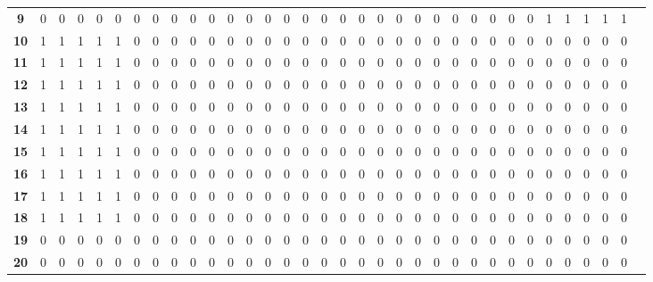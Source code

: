 \documentclass[Main]{subfiles}
\begin{document}
\begin{table}[H]
{\begin{tabular}{cccccccccccccccccccccccccccccccccc}
			\textbf{ 9} &  0 &  0 &  0 &  0 &  0 &  0 &  0 &  0 &  0 &  0 &  0 &  0 &  0 &  0 &  0 &  0 &  0 &  0 &  0 &  0 &  0 &  0 &  0 &  0 &  0 &  0 &  0 &  1 &  1 &  1 &  1 &  1 \\
			\textbf{10} &  1 &  1 &  1 &  1 &  1 &  0 &  0 &  0 &  0 &  0 &  0 &  0 &  0 &  0 &  0 &  0 &  0 &  0 &  0 &  0 &  0 &  0 &  0 &  0 &  0 &  0 &  0 &  0 &  0 &  0 &  0 &  0 \\
			\textbf{11} &  1 &  1 &  1 &  1 &  1 &  0 &  0 &  0 &  0 &  0 &  0 &  0 &  0 &  0 &  0 &  0 &  0 &  0 &  0 &  0 &  0 &  0 &  0 &  0 &  0 &  0 &  0 &  0 &  0 &  0 &  0 &  0 \\
			\textbf{12} &  1 &  1 &  1 &  1 &  1 &  0 &  0 &  0 &  0 &  0 &  0 &  0 &  0 &  0 &  0 &  0 &  0 &  0 &  0 &  0 &  0 &  0 &  0 &  0 &  0 &  0 &  0 &  0 &  0 &  0 &  0 &  0 \\
			\textbf{13} &  1 &  1 &  1 &  1 &  1 &  0 &  0 &  0 &  0 &  0 &  0 &  0 &  0 &  0 &  0 &  0 &  0 &  0 &  0 &  0 &  0 &  0 &  0 &  0 &  0 &  0 &  0 &  0 &  0 &  0 &  0 &  0 \\
			\textbf{14} &  1 &  1 &  1 &  1 &  1 &  0 &  0 &  0 &  0 &  0 &  0 &  0 &  0 &  0 &  0 &  0 &  0 &  0 &  0 &  0 &  0 &  0 &  0 &  0 &  0 &  0 &  0 &  0 &  0 &  0 &  0 &  0 \\
			\textbf{15} &  1 &  1 &  1 &  1 &  1 &  0 &  0 &  0 &  0 &  0 &  0 &  0 &  0 &  0 &  0 &  0 &  0 &  0 &  0 &  0 &  0 &  0 &  0 &  0 &  0 &  0 &  0 &  0 &  0 &  0 &  0 &  0 \\
			\textbf{16} &  1 &  1 &  1 &  1 &  1 &  0 &  0 &  0 &  0 &  0 &  0 &  0 &  0 &  0 &  0 &  0 &  0 &  0 &  0 &  0 &  0 &  0 &  0 &  0 &  0 &  0 &  0 &  0 &  0 &  0 &  0 &  0 \\
			\textbf{17} &  1 &  1 &  1 &  1 &  1 &  0 &  0 &  0 &  0 &  0 &  0 &  0 &  0 &  0 &  0 &  0 &  0 &  0 &  0 &  0 &  0 &  0 &  0 &  0 &  0 &  0 &  0 &  0 &  0 &  0 &  0 &  0 \\
			\textbf{18} &  1 &  1 &  1 &  1 &  1 &  0 &  0 &  0 &  0 &  0 &  0 &  0 &  0 &  0 &  0 &  0 &  0 &  0 &  0 &  0 &  0 &  0 &  0 &  0 &  0 &  0 &  0 &  0 &  0 &  0 &  0 &  0 \\
			\textbf{19} &  0 &  0 &  0 &  0 &  0 &  0 &  0 &  0 &  0 &  0 &  0 &  0 &  0 &  0 &  0 &  0 &  0 &  0 &  0 &  0 &  0 &  0 &  0 &  0 &  0 &  0 &  0 &  0 &  0 &  0 &  0 &  0 \\
			\textbf{20} &  0 &  0 &  0 &  0 &  0 &  0 &  0 &  0 &  0 &  0 &  0 &  0 &  0 &  0 &  0 &  0 &  0 &  0 &  0 &  0 &  0 &  0 &  0 &  0 &  0 &  0 &  0 &  0 &  0 &  0 &  0 &  0 \\

\end{tabular}}
\end{table}
\end{document}
